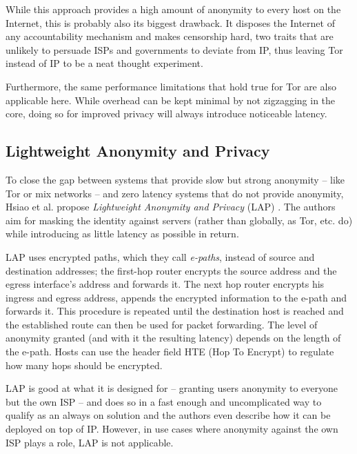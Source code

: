 \documentclass{acm_proc_article-sp}
\begin{document}
While this approach provides a high amount of anonymity to every host on the Internet, this is probably also its biggest drawback. It disposes the Internet of any accountability mechanism and makes censorship hard, two traits that are unlikely to persuade ISPs and governments to deviate from IP, thus leaving Tor instead of IP to be a neat thought experiment.

Furthermore, the same performance limitations that hold true for Tor are also applicable here. While overhead can be kept minimal by not zigzagging in the core, doing so for improved privacy will always introduce noticeable latency.
\subsection{Lightweight Anonymity and Privacy}
To close the gap between systems that provide slow but strong anonymity -- like Tor or mix networks -- and zero latency systems that do not provide anonymity, Hsiao et al. propose \emph{Lightweight Anonymity and Privacy} (LAP) \cite{lap}. The authors aim for masking the identity against servers (rather than globally, as Tor, etc. do) while introducing as little latency as possible in return. 

LAP uses encrypted paths, which they call \emph{e-paths}, instead of source and destination addresses; the first-hop router encrypts the source address and the egress interface's address and forwards it. The next hop router encrypts his ingress and egress address, appends the encrypted information to the e-path and forwards it. This procedure is repeated until the destination host is reached and the established route can then be used for packet forwarding. The level of anonymity granted (and with it the resulting latency) depends on the length of the e-path. Hosts can use the header field HTE (Hop To Encrypt) to regulate how many hops should be encrypted.

LAP is good at what it is designed for -- granting users anonymity to everyone but the own ISP -- and does so in a fast enough and uncomplicated way to qualify as an always on solution and the authors even describe how it can be deployed on top of IP. However, in use cases where anonymity against the own ISP plays a role, LAP is not applicable.

\end{document}
